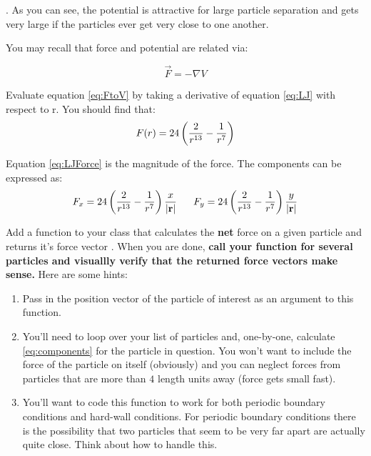 .  As you can see, the potential is
attractive for large particle separation and gets very large if the
particles ever get very close to one another.  

You may recall that force and potential are related via:

\begin{equation}\label{eq:FtoV}
\vec{F} = - \nabla V
\end{equation}

\begin{enumerate}
\probtwo Evaluate equation \ref{eq:FtoV} by taking a derivative of
  equation \ref{eq:LJ} with respect to r.  You should find that:
\begin{equation}\label{eq:LJForce}
F(r) = 24 \left( {2 \over r^{13}} - {1\over r^7}\right)
\end{equation}
\end{enumerate}

Equation \ref{eq:LJForce} is the magnitude of the force.  The
components can be expressed as:
\begin{equation}\label{eq:components}
F_x = 24 \left( {2 \over r^{13}} - {1\over r^7}\right) {x\over
  |\vec{r}|} \mathrm{~~~~~} F_y = 24 \left( {2 \over r^{13}} - {1\over r^7}\right) {y\over
  |\vec{r}|}
\end{equation}
\begin{enumerate}
  \probtwo Add a function to your class that calculates the
  \textbf{net} force on a given particle and returns it's force vector
  . When you are done, \textbf{call your function for several
    particles and visuallly verify that the returned force vectors make
    sense.} Here are some hints:
\begin{enumerate}
\item  Pass in the position vector of the particle of interest as an argument to this function.
\item You'll need to loop over your list of particles and,
  one-by-one, calculate \ref{eq:components} for the particle in
  question. You won't want to include the force of the particle on
  itself (obviously) and you can neglect forces from particles that
  are more than $4$ length units away (force gets small fast).
\item You'll want to code this function to work for both periodic
  boundary conditions and hard-wall conditions.  For periodic boundary
  conditions there is the possibility that two particles that seem to
  be very far apart are actually quite close. Think about how to
  handle this.
\end{enumerate}

\end{enumerate}


